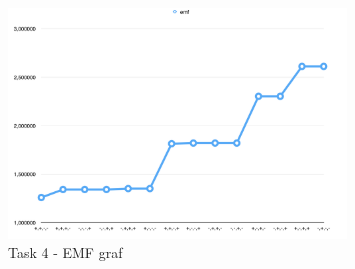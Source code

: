 \begin{figure}[h]
		\centering
	    \includegraphics[width=0.8\textwidth]{sections/Exercise4/task4emf_graph.png}
		    \caption{Task 4 - EMF graf}
		    \label{fig:task4EMF_graph}
	\end{figure}

